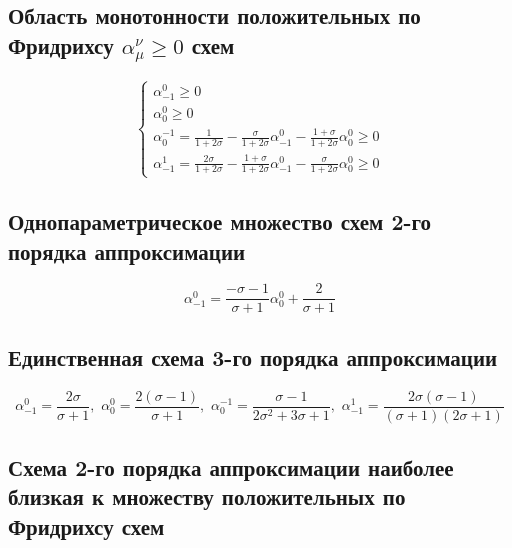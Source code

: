 \documentclass[a4paper, 12pt]{article} %
\begin{document}
\subsection{Область монотонности положительных по Фридрихсу $\alpha^\nu_\mu \geqslant 0$ схем}
\begin{equation*}
 \begin{cases}
 	\alpha^{0}_{-1} \geqslant 0  \\  
 	\alpha^{0}_{0} \geqslant 0 \\
 	\alpha^{-1}_{0} = \frac{1}{1+2\sigma} - \frac{\sigma}{1 + 2\sigma}\alpha^{0}_{-1} - \frac{1 + \sigma}{1 + 2\sigma}\alpha^{0}_{0} \geqslant 0 \\
 	\alpha^{1}_{-1} = \frac{2\sigma}{1+2\sigma} - \frac{1 + \sigma}{1 + 2\sigma}\alpha^{0}_{-1} - \frac{\sigma}{1 + 2\sigma}\alpha^{0}_{0} \geqslant 0 
 \end{cases}
\end{equation*}

\subsection{Однопараметрическое множество схем 2-го порядка аппроксимации}
$$\alpha^{0}_{-1} = \frac{-\sigma-1}{\sigma+1} \alpha^{0}_{0}+ \frac{2}{\sigma+1}$$

\subsection{Единственная схема 3-го порядка аппроксимации}
$$\alpha^{0}_{-1} = \frac{2\sigma}{\sigma + 1},\,\, 
  \alpha^{0}_{0} = \frac{2(\sigma - 1)}{\sigma + 1}, \,\,
  \alpha^{-1}_{0} = \frac{\sigma - 1}{2\sigma^2 + 3\sigma + 1},\,\,
  \alpha^{1}_{-1} = \frac{2\sigma(\sigma-1)}{(\sigma+1)(2\sigma + 1)}$$


\subsection{Схема 2-го порядка аппроксимации наиболее близкая к множеству положительных по Фридрихсу схем}
\end{document}
